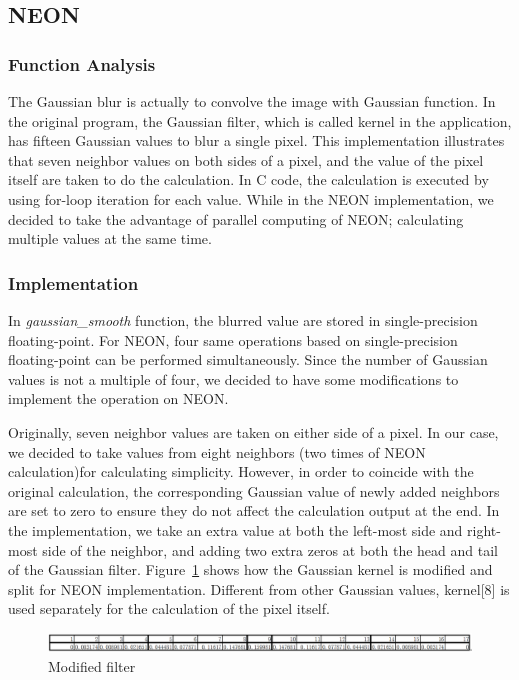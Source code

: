 \subsection{NEON}
\subsubsection{Function Analysis}

The Gaussian blur is actually to convolve the image with Gaussian function. In the original program, the Gaussian filter, which is called kernel in the application, has fifteen Gaussian values to blur a single pixel. This implementation illustrates that seven neighbor values on both sides of a pixel, and the value of the pixel itself are taken to do the calculation. In C code, the calculation is executed by using for-loop iteration for each value. While in the NEON implementation, we decided to take the advantage of parallel computing of NEON; calculating multiple values at the same time.

\subsubsection{Implementation}

In \textit{gaussian\_smooth} function, the blurred value are stored in single-precision floating-point. For NEON, four same operations based on single-precision floating-point can be performed simultaneously. Since the number of Gaussian values is not a multiple of four, we decided to have some modifications to implement the operation on NEON. 

Originally, seven neighbor values are taken on either side of a pixel. In our case, we decided to take values from eight neighbors (two times of NEON calculation)for calculating simplicity. However, in order to coincide with the original calculation, the corresponding Gaussian value of newly added neighbors are set to zero to ensure they do not affect the calculation output at the end. In the implementation, we take an extra value at both the left-most side and right-most side of the neighbor, and adding two extra zeros at both the head and tail of the Gaussian filter. Figure~\ref{fig:newfilter} shows how the Gaussian kernel is modified and split for NEON implementation. Different from other Gaussian values, kernel[8] is used separately for the calculation of the pixel itself. 

\begin{figure}
\centering
\includegraphics[width=\linewidth]{drawings/filter}
\caption{Modified filter}
\label{fig:newfilter}
\end{figure}

